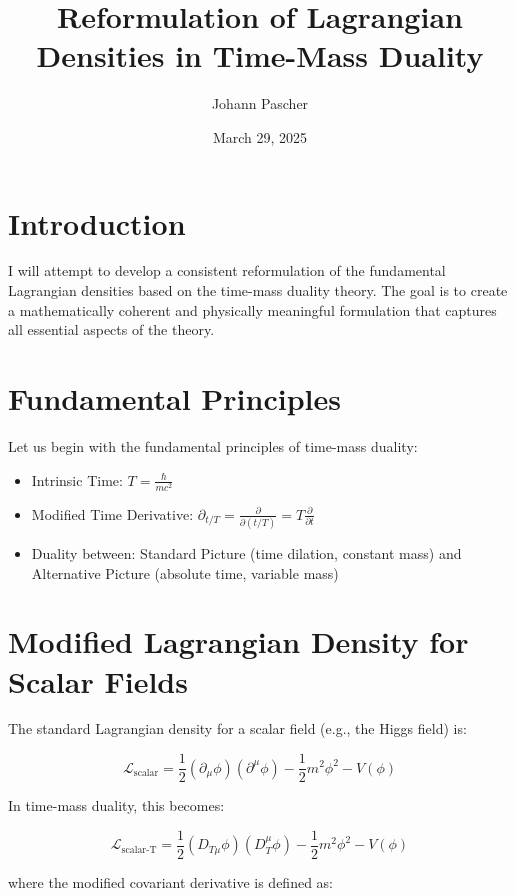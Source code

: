 \documentclass{article}
\title{Reformulation of Lagrangian Densities in Time-Mass Duality}
\author{Johann Pascher}
\date{March 29, 2025}
\begin{document}
	
	\maketitle
	
	\section*{Introduction}
	I will attempt to develop a consistent reformulation of the fundamental Lagrangian densities based on the time-mass duality theory. The goal is to create a mathematically coherent and physically meaningful formulation that captures all essential aspects of the theory.
	
	\section{Fundamental Principles}
	Let us begin with the fundamental principles of time-mass duality:
	
	\begin{itemize}
		\item Intrinsic Time: \( T = \frac{\hbar}{m c^2} \)
		\item Modified Time Derivative: \( \partial_{t/T} = \frac{\partial}{\partial(t/T)} = T \frac{\partial}{\partial t} \)
		\item Duality between: Standard Picture (time dilation, constant mass) and Alternative Picture (absolute time, variable mass)
	\end{itemize}
	
	\section{Modified Lagrangian Density for Scalar Fields}
	The standard Lagrangian density for a scalar field (e.g., the Higgs field) is:
	
	\begin{equation}
		\mathcal{L}_{\text{scalar}} = \frac{1}{2} (\partial_\mu \phi) (\partial^\mu \phi) - \frac{1}{2} m^2 \phi^2 - V(\phi)
	\end{equation}
	
	In time-mass duality, this becomes:
	
	\begin{equation}
		\mathcal{L}_{\text{scalar-T}} = \frac{1}{2} (D_{T\mu} \phi) (D_T^\mu \phi) - \frac{1}{2} m^2 \phi^2 - V(\phi)
	\end{equation}
	
	where the modified covariant derivative is defined as:
	
\end{document}
